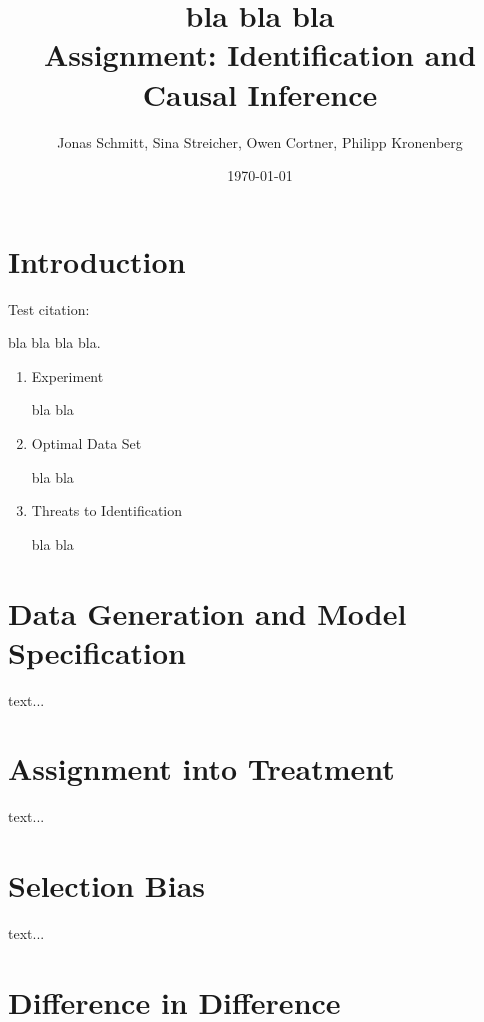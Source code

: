 



\title{\huge bla bla bla \\
\LARGE Assignment: Identification and Causal Inference}

\author{Jonas Schmitt, Sina Streicher, Owen Cortner, Philipp Kronenberg}

\date{\small \today}

\clearpage\maketitle
\thispagestyle{empty}

\renewcommand{\labelenumi}{\alph{enumi})}

\section{Introduction} \label{sec:introduction}

Test citation:

bla bla \cite{Foroni2011} bla bla. \\

\begin{enumerate}
\item Experiment

bla bla \\
\item Optimal Data Set

bla bla \\

\item Threats to Identification

bla bla \\

\end{enumerate}

\section{Data Generation and Model Specification} \label{sec:data}

text...

\section{Assignment into Treatment} \label{sec:assignment}

text...

\section{Selection Bias} \label{sec:selection}

text...


\section{Difference in Difference} \label{sec:difference}



\clearpage





\clearpage


